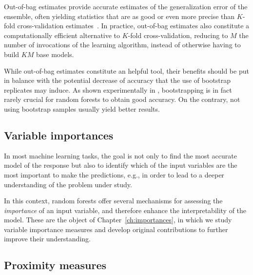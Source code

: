 Out-of-bag estimates provide accurate estimates of the
generalization error of the ensemble, often yielding statistics that are as
good or even more precise than $K$-fold cross-validation
estimates~\citep{wolpert:1999}. In practice, out-of-bag estimates also
constitute a computationally efficient alternative to $K$-fold cross-validation,
reducing to $M$ the number of invocations of the learning
algorithm, instead of otherwise having to build $KM$ base models.

While out-of-bag estimates constitute an helpful tool, their benefits should be
put in balance with the potential decrease of accuracy that the use of
bootstrap replicates may induce. As shown experimentally in
\citep{louppe:2012}, bootstrapping is in fact rarely crucial for random forests
to obtain good accuracy. On the contrary, not using bootstrap samples usually
yield better results.

\subsection{Variable importances}

In most machine learning tasks, the goal is not only to find the most accurate
model of the response but also to identify which of the input variables are the
most important to make the predictions, e.g., in order to lead to a deeper
understanding of the problem under study.

In this context, random forests offer several mechanisms for assessing the
\textit{importance} of an input variable, and therefore enhance the
interpretability of the model. These are the object of
Chapter~\ref{ch:importances}, in which we study variable importance measures
and develop original contributions to further improve their understanding.

\subsection{Proximity measures}

